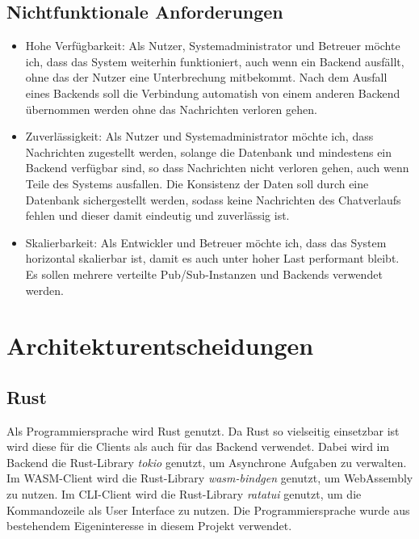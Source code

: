 \subsection{Nichtfunktionale Anforderungen}
\begin{itemize}
  \item Hohe Verfügbarkeit: Als Nutzer, Systemadministrator und Betreuer möchte ich, dass das System weiterhin funktioniert, auch wenn ein Backend ausfällt, ohne das der Nutzer eine Unterbrechung mitbekommt. Nach dem Ausfall eines Backends soll die Verbindung automatish von einem anderen Backend übernommen werden ohne das Nachrichten verloren gehen.
  \item Zuverlässigkeit: Als Nutzer und Systemadministrator möchte ich, dass Nachrichten zugestellt werden, solange die Datenbank und mindestens ein Backend verfügbar sind, so dass Nachrichten nicht verloren gehen, auch wenn Teile des Systems ausfallen. Die Konsistenz der Daten soll durch eine Datenbank sichergestellt werden, sodass keine Nachrichten des Chatverlaufs fehlen und dieser damit eindeutig und zuverlässig ist.
  \item Skalierbarkeit: Als Entwickler und Betreuer möchte ich, dass das System horizontal skalierbar ist, damit es auch unter hoher Last performant bleibt. Es sollen mehrere verteilte Pub/Sub-Instanzen und Backends verwendet werden.
\end{itemize}

\section{Architekturentscheidungen}

\subsection{Rust}
Als Programmiersprache wird Rust genutzt.
Da Rust so vielseitig einsetzbar ist wird diese für die Clients als auch für das Backend verwendet.
Dabei wird im Backend die Rust-Library \textit{tokio} genutzt, um Asynchrone Aufgaben zu verwalten.
Im \ac{WASM}-Client wird die Rust-Library \textit{wasm-bindgen} genutzt, um WebAssembly zu nutzen.
Im \ac{CLI}-Client wird die Rust-Library \textit{ratatui} genutzt, um die Kommandozeile als User Interface zu nutzen.
Die Programmiersprache wurde aus bestehendem Eigeninteresse in diesem Projekt verwendet.

